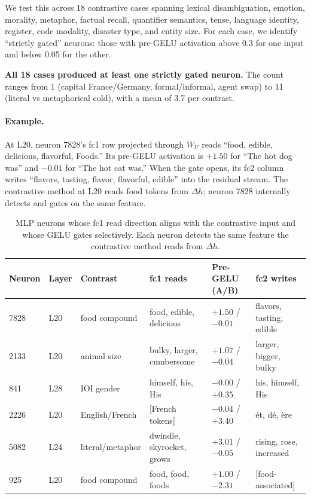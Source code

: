 \documentclass[11pt]{article}
\newcommand{\dhh}{\Delta h}
\newcommand{\WU}{W_U}
\begin{document}
We test this across 18 contrastive cases spanning lexical disambiguation,
emotion, morality, metaphor, factual recall, quantifier semantics, tense,
language identity, register, code modality, disaster type, and entity size.
For each case, we identify ``strictly gated'' neurons: those with pre-GELU
activation above 0.3 for one input and below 0.05 for the other.

\textbf{All 18 cases produced at least one strictly gated neuron.} The count
ranges from 1 (capital France/Germany, formal/informal, agent swap) to 11
(literal vs metaphorical cold), with a mean of 3.7 per contrast.

\paragraph{Example.} At L20, neuron 7828's fc1 row projected through $\WU$ reads
``food, edible, delicious, flavorful, Foods.'' Its pre-GELU activation is
$+1.50$ for ``The hot dog was'' and $-0.01$ for ``The hot cat was.'' When the gate
opens, its fc2 column writes ``flavors, tasting, flavor, flavorful, edible''
into the residual stream. The contrastive method at L20 reads food tokens
from $\dhh$; neuron 7828 internally detects and gates on the same feature.

\begin{table}[htbp]
\centering
\small
\begin{tabular}{llllll}
\toprule
Neuron & Layer & Contrast & fc1 reads & Pre-GELU (A/B) & fc2 writes \\
\midrule
7828 & L20 & food compound & food, edible, delicious & $+1.50$ / $-0.01$ & flavors, tasting, edible \\
2133 & L20 & animal size & bulky, larger, cumbersome & $+1.07$ / $-0.04$ & larger, bigger, bulky \\
841 & L28 & IOI gender & himself, his, His & $-0.00$ / $+0.35$ & his, himself, His \\
2226 & L20 & English/French & [French tokens] & $-0.04$ / $+3.40$ & ét, dé, ère \\
5082 & L24 & literal/metaphor & dwindle, skyrocket, grows & $+3.01$ / $-0.05$ & rising, rose, increased \\
925 & L20 & food compound & food, food, foods & $+1.00$ / $-2.31$ & [food-associated] \\
\bottomrule
\end{tabular}
\caption{MLP neurons whose fc1 read direction aligns with the contrastive
input and whose GELU gates selectively. Each neuron detects the same feature
the contrastive method reads from $\dhh$.}
\label{tab:neurons}
\end{table}
\end{document}
